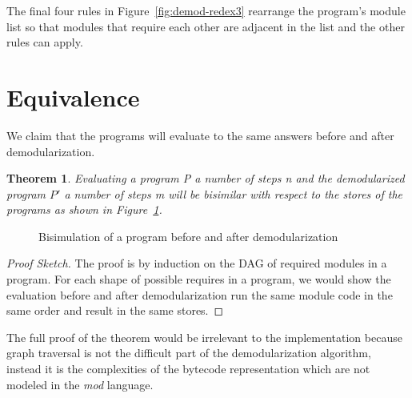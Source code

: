 The final four rules in Figure~\ref{fig:demod-redex3} rearrange the program's module list so that modules that require each other are adjacent in the list and the other rules can apply.

\section{Equivalence}
We claim that the programs will evaluate to the same answers before and after demodularization. 

\newtheorem*{theorem}{Theorem}
\begin{theorem}
Evaluating a program P a number of steps n and the demodularized program $P'$ a number of steps m will be bisimilar with respect to the stores of the programs as shown in Figure~\ref{fig:bisim.tex}.
\end{theorem}

\begin{figure}[h]
  \centering
  
  \caption{Bisimulation of a program before and after demodularization}
  \label{fig:bisim.tex}
\end{figure}


\begin{proof}[Proof Sketch]
The proof is by induction on the DAG of required modules in a program.
For each shape of possible requires in a program, we would show the evaluation before and after demodularization run the same module code in the same order and result in the same stores.
\end{proof}

The full proof of the theorem would be irrelevant to the implementation because graph traversal is not the difficult part of the demodularization algorithm, instead it is the complexities of the bytecode representation which are not modeled in the \emph{mod} language.

